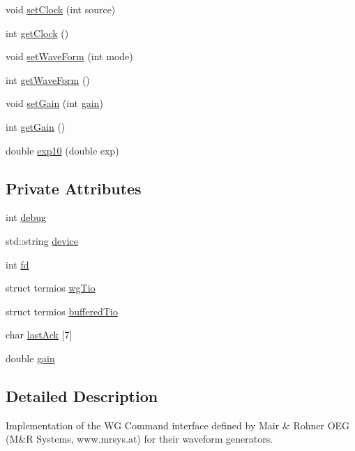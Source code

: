 \begin{DoxyCompactItemize}
\item 
void \hyperlink{classWGCommand_a23bf43da881800b384e3d6ef88747187}{set\-Clock} (int source)
\item 
int \hyperlink{classWGCommand_a43b9e42d1eb6de888ec4555271207073}{get\-Clock} ()
\item 
void \hyperlink{classWGCommand_a7bfa70c2e89d9face4c826fd3f788c4b}{set\-Wave\-Form} (int mode)
\item 
int \hyperlink{classWGCommand_a13f47f4516c2b2d0f306d7b191d285cc}{get\-Wave\-Form} ()
\item 
void \hyperlink{classWGCommand_a2e9c8acc3d2064530cb42a437a10e4f5}{set\-Gain} (int \hyperlink{classWGCommand_a48891c9df29d1988fe828bb18906bf89}{gain})
\item 
int \hyperlink{classWGCommand_a99c983f98ac8966616850595561270e7}{get\-Gain} ()
\item 
double \hyperlink{classWGCommand_a135690529a0aa3acc784db2bb6063857}{exp10} (double exp)
\end{DoxyCompactItemize}
\subsection*{Private Attributes}
\begin{DoxyCompactItemize}
\item 
int \hyperlink{classWGCommand_a2e554051536b4ee562c3ccd49071e0be}{debug}
\item 
std\-::string \hyperlink{classWGCommand_ad87845443f95cc2d0fb33299a13de26b}{device}
\item 
int \hyperlink{classWGCommand_a6f4376a362141d0f49efe521156d838b}{fd}
\item 
struct termios \hyperlink{classWGCommand_a82bdfe137d61716e32ffd2b7dd69d9e2}{wg\-Tio}
\item 
struct termios \hyperlink{classWGCommand_aa87ce887cb2d9c80cfe87efd84fa4362}{buffered\-Tio}
\item 
char \hyperlink{classWGCommand_a05dbd3492228efc134722a23daff633f}{last\-Ack} \mbox{[}7\mbox{]}
\item 
double \hyperlink{classWGCommand_a48891c9df29d1988fe828bb18906bf89}{gain}
\end{DoxyCompactItemize}


\subsection{Detailed Description}
Implementation of the W\-G Command interface defined by Mair \& Rohner O\-E\-G (M\&R Systems, www.\-mrsys.\-at) for their waveform generators.

